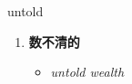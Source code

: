 
\begin{frame}
{\huge untold}
\begin{center}
\begin{enumerate}\Large
  \item \textbf{数不清的}
  \begin{itemize}
    \item \em{\Large{untold wealth}}
  \end{itemize}
\end{enumerate}
\end{center}
\end{frame}
